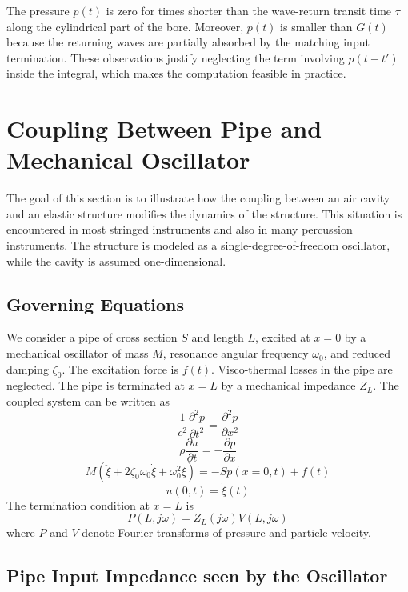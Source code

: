 The pressure \( p(t) \) is zero for times shorter than the wave-return transit time \( \tau \) along the cylindrical part of the bore. Moreover, \( p(t) \) is smaller than \( G(t) \) because the returning waves are partially absorbed by the matching input termination. These observations justify neglecting the term involving \( p(t-t') \) inside the integral, which makes the computation feasible in practice. 

\section{Coupling Between Pipe and Mechanical Oscillator}

The goal of this section is to illustrate how the coupling between an air cavity and an elastic structure modifies the dynamics of the structure. This situation is encountered in most stringed instruments and also in many percussion instruments. The structure is modeled as a single-degree-of-freedom oscillator, while the cavity is assumed one-dimensional. 

\subsection{Governing Equations}

We consider a pipe of cross section \( S \) and length \( L \), excited at \( x=0 \) by a mechanical oscillator of mass \( M \), resonance angular frequency \( \omega_{0} \), and reduced damping \( \zeta_{0} \). The excitation force is \( f(t) \). Visco-thermal losses in the pipe are neglected. The pipe is terminated at \( x=L \) by a mechanical impedance \( Z_{L} \). The coupled system can be written as
\[
\frac{1}{c^{2}}\frac{\partial^{2}p}{\partial t^{2}}=\frac{\partial^{2}p}{\partial x^{2}}
\]
\[
\rho\frac{\partial u}{\partial t}=-\frac{\partial p}{\partial x}
\]
\[
M\left(\ddot{\xi}+2\zeta_{0}\omega_{0}\dot{\xi}+\omega_{0}^{2}\xi\right)=-Sp(x=0,t)+f(t)
\]
\[
u(0,t)=\dot{\xi}(t)
\]
The termination condition at \( x=L \) is
\[
P(L,j\omega)=Z_{L}(j\omega)V(L,j\omega)
\]
where \( P \) and \( V \) denote Fourier transforms of pressure and particle velocity. 

\subsection{Pipe Input Impedance seen by the Oscillator}

